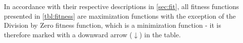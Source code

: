 In accordance with their respective descriptions in \cref{sec:fit}, all fitness functions presented in
\cref{tbl:fitness} are maximization functions with the exception of the Division by Zero fitness
function, which is a minimization function - it is therefore marked with a downward arrow ($\downarrow$) in the
table.








